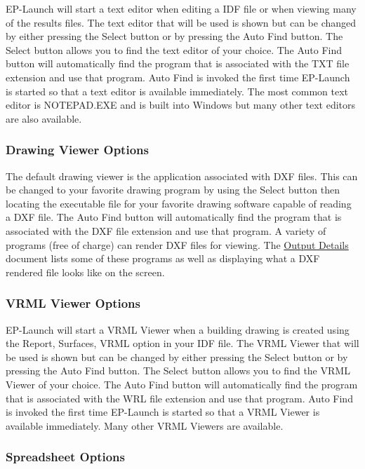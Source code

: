 EP-Launch will start a text editor when editing a IDF file or when viewing many of the results files. The text editor that will be used is shown but can be changed by either pressing the Select button or by pressing the Auto Find button. The Select button allows you to find the text editor of your choice. The Auto Find button will automatically find the program that is associated with the TXT file extension and use that program. Auto Find is invoked the first time EP-Launch is started so that a text editor is available immediately. The most common text editor is NOTEPAD.EXE and is built into Windows but many other text editors are also available.

\subsubsection{Drawing Viewer Options}\label{drawing-viewer-options}

The default drawing viewer is the application associated with DXF files. This can be changed to your favorite drawing program by using the Select button then locating the executable file for your favorite drawing software capable of reading a DXF file. The Auto Find button will automatically find the program that is associated with the DXF file extension and use that program. A variety of programs (free of charge) can render DXF files for viewing. The \href{file:///E:/Docs4PDFs/OutputDetailsAndExamples.pdf}{Output Details} document lists some of these programs as well as displaying what a DXF rendered file looks like on the screen.

\subsubsection{VRML Viewer Options}\label{vrml-viewer-options}

EP-Launch will start a VRML Viewer when a building drawing is created using the Report, Surfaces, VRML option in your IDF file. The VRML Viewer that will be used is shown but can be changed by either pressing the Select button or by pressing the Auto Find button. The Select button allows you to find the VRML Viewer of your choice. The Auto Find button will automatically find the program that is associated with the WRL file extension and use that program. Auto Find is invoked the first time EP-Launch is started so that a VRML Viewer is available immediately. Many other VRML Viewers are available.

\subsubsection{Spreadsheet Options}\label{spreadsheet-options}

